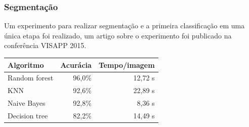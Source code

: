 \documentclass[t]{beamer}
\begin{document}
\begin{frame}
	\frametitle{Segmentação}

	Um experimento para realizar segmentação e a primeira classificação em uma única etapa foi realizado, um artigo sobre o experimento foi publicado  na conferência VISAPP 2015. 

	\small{
	\begin{table}
	\centering
	\begin{tabulary}{\linewidth}{|L|R|R|}
		\hline
		\textbf{Algoritmo} & \textbf{Acurácia} & \textbf{Tempo/imagem} \\ \hline
		Random forest  & 96,0\% & 12,72 s \\ \hline
		KNN            & 92,6\% & 22,89 s \\ \hline
		Naive Bayes    & 92,8\% & 8,36 s \\ \hline
		Decision tree  & 82,2\% & 14,49 s \\ \hline
	\end{tabulary}
	\end{table}
	}

\end{frame}
\end{document}
